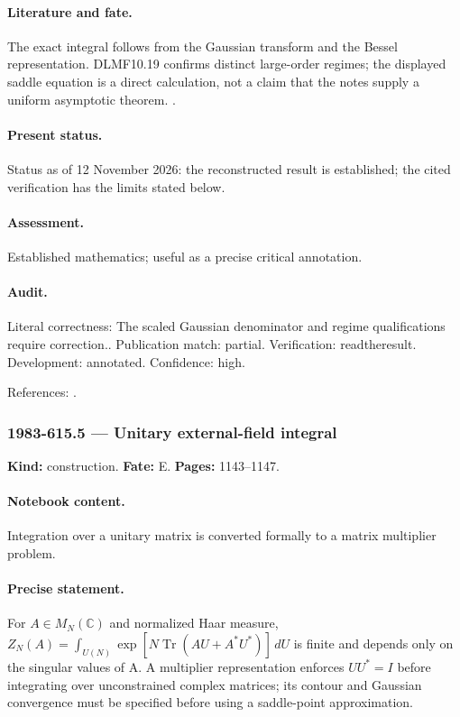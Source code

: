 \paragraph{Literature and fate.} The exact integral follows from the Gaussian transform and the Bessel representation. DLMF10.19 confirms distinct large-order regimes; the displayed saddle equation is a direct calculation, not a claim that the notes supply a uniform asymptotic theorem. \citep{nist2026bessel}.

\paragraph{Present status.} Status as of 12 November 2026: the reconstructed result is established; the cited verification has the limits stated below.

\paragraph{Assessment.} Established mathematics; useful as a precise critical annotation.

\paragraph{Audit.} Literal correctness: The scaled Gaussian denominator and regime qualifications require correction.. Publication match: partial. Verification: readtheresult. Development: annotated. Confidence: high.

\noindent References: \citep{nist2026bessel}.\par

\subsubsection{1983-615.5 --- Unitary external-field integral}

\label{item:1983-615.5}

\noindent\textbf{Kind:} construction. \textbf{Fate:} E. \textbf{Pages:} 1143--1147.\par

\paragraph{Notebook content.} Integration over a unitary matrix is converted formally to a matrix multiplier problem.

\paragraph{Precise statement.} For $A\in M_N(\mathbb C)$ and normalized Haar measure, $Z_N(A)=\int_{U(N)}\exp[N\operatorname{Tr}(AU+A^*U^*)]\,dU$ is finite and depends only on the singular values of A. A multiplier representation enforces $UU^*=I$ before integrating over unconstrained complex matrices; its contour and Gaussian convergence must be specified before using a saddle-point approximation.

